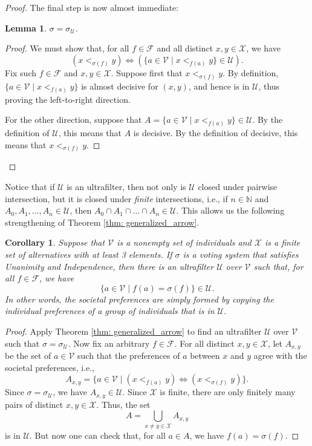 \documentclass[a4paper]{memoir}
\newtheorem{lemma}[theorem]{Lemma}
\newtheorem{corollary}[theorem]{Corollary}
\theoremstyle{definition}
\newcommand{\bb}{\mathbb}
\newcommand{\mc}{\mathcal}
\begin{document}
\begin{proof}
  The final step is now almost immediate:
  \begin{lemma}
    $\sigma = \sigma_{\mc{U}}$.
  \end{lemma}
  
  \begin{proof}
    We must show that, for all $f \in \mc{F}$ and all distinct $x,y \in \mc{X}$, we have
    \[
      (x <_{\sigma(f)} y) \Longleftrightarrow (\{a \in \mc{V} \mid x <_{f(a)} y\} \in \mc{U}).
    \]
    Fix such $f \in \mc{F}$ and $x,y \in \mc{X}$. Suppose first that $x <_{\sigma(f)} y$. 
    By definition, $\{a \in \mc{V} \mid x <_{f(a)} y\}$ is almost decisive for $(x,y)$, and 
    hence is in $\mc{U}$, thus proving the left-to-right direction.
    
    For the other direction, suppose that $A = \{a \in \mc{V} \mid x <_{f(a)} y\} \in \mc{U}$. 
    By the definition of $\mc{U}$, this means that $A$ is decisive. By the definition of 
    decisive, this means that $x <_{\sigma(f)} y$.
  \end{proof}
\end{proof}

Notice that if $\mc{U}$ is an ultrafilter, then not only is $\mc{U}$ closed under pairwise 
intersection, but it is closed under \emph{finite} intersections, i.e., if 
$n \in \bb{N}$ and $A_0, A_1, \ldots, A_n \in \mc{U}$, then 
$A_0 \cap A_1 \cap \ldots \cap A_n \in \mc{U}$. This allows us the following strengthening of 
Theorem \ref{thm: generalized_arrow}.

\begin{corollary}
  Suppose that $\mc{V}$ is a nonempty set of individuals and $\mc{X}$ is a finite set of 
  alternatives with at least 3 elements. If $\sigma$ is a voting system that satisfies 
  Unanimity and Independence, then there is an ultrafilter $\mc{U}$ over $\mc{V}$ 
  such that, for all $f \in \mc{F}$, we have
  \[
    \{a \in \mc{V} \mid f(a) = \sigma(f)\} \in \mc{U}.
  \]
  In other words, the societal preferences are simply formed by copying the individual preferences 
  of a group of individuals that is in $\mc{U}$.
\end{corollary}

\begin{proof}
  Apply Theorem \ref{thm: generalized_arrow} to find an ultrafilter $\mc{U}$ over 
  $\mc{V}$ such that $\sigma = \sigma_{\mc{U}}$. Now fix an arbitrary $f \in \mc{F}$. 
  For all distinct $x,y \in \mc{X}$, let $A_{x,y}$ be the set of $a \in \mc{V}$ such 
  that the preferences of $a$ between $x$ and $y$ agree with the societal preferences, i.e., 
  \[
    A_{x,y} = \{a \in \mc{V} \mid (x <_{f(a)} y) \Leftrightarrow (x <_{\sigma(f)} y)\}.
  \]
  Since $\sigma = \sigma_{\mc{U}}$, we have $A_{x,y} \in \mc{U}$. Since $\mc{X}$ is finite, 
  there are only finitely many pairs of distinct $x,y \in \mc{X}$. Thus, the set
  \[
    A = \bigcup_{x \neq y \in \mc{X}} A_{x,y}
  \]
   is in $\mc{U}$. But now one can check that, for all $a \in A$, we have 
   $f(a) = \sigma(f)$.
\end{proof}
\end{document}
